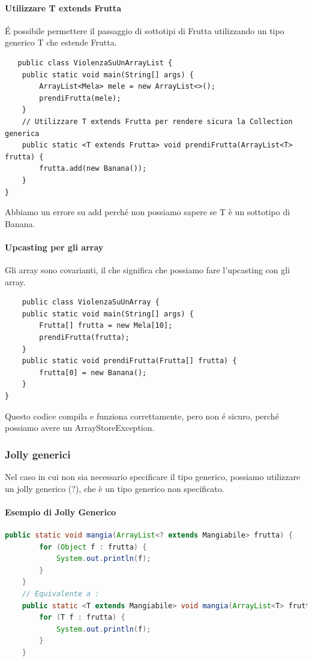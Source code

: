 \documentclass[11pt]{article}
\begin{document}
\paragraph{ Utilizzare T  extends Frutta}
É possibile permettere il passaggio di sottotipi di Frutta utilizzando un tipo generico T che estende Frutta.
\begin{lstlisting}
   public class ViolenzaSuUnArrayList {
    public static void main(String[] args) {
        ArrayList<Mela> mele = new ArrayList<>();
        prendiFrutta(mele);
    }
    // Utilizzare T extends Frutta per rendere sicura la Collection generica
    public static <T extends Frutta> void prendiFrutta(ArrayList<T> frutta) {
        frutta.add(new Banana());
    }
}
\end{lstlisting}
Abbiamo un errore su add perché non possiamo sapere se T è un sottotipo di Banana.
\paragraph{Upcasting per gli array}
Gli array sono covarianti, il che significa che possiamo fare l'upcasting con gli array.
\begin{lstlisting}
    public class ViolenzaSuUnArray {
    public static void main(String[] args) {
        Frutta[] frutta = new Mela[10];
        prendiFrutta(frutta);
    }
    public static void prendiFrutta(Frutta[] frutta) {
        frutta[0] = new Banana();
    }
}
\end{lstlisting}
Questo codice compila e funziona correttamente, pero non é sicuro, perché possiamo avere un ArrayStoreException.
\subsubsection{Jolly generici}
Nel caso in cui non sia necessario specificare il tipo generico, possiamo utilizzare un jolly generico (?), che è un tipo generico non specificato.
\paragraph{Esempio di Jolly Generico}
\begin{lstlisting}[language=Java]
    public static void mangia(ArrayList<? extends Mangiabile> frutta) {
        for (Object f : frutta) {
            System.out.println(f);
        }
    }
    // Equivalente a :
    public static <T extends Mangiabile> void mangia(ArrayList<T> frutta) {
        for (T f : frutta) {
            System.out.println(f);
        }
    }
\end{lstlisting}
\end{document}
